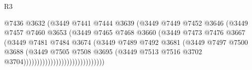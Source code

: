\begin{lexlean}{R3}
\begin{coremodule}
                                            @7436
                                            @3632
                                            (@3449
                                              @7441
                                              @7444
                                              @3639
                                              (@3449
                                                @7449
                                                @7452
                                                @3646
                                                (@3449
                                                  @7457
                                                  @7460
                                                  @3653
                                                  (@3449
                                                    @7465
                                                    @7468
                                                    @3660
                                                    (@3449
                                                      @7473
                                                      @7476
                                                      @3667
                                                      (@3449
                                                        @7481
                                                        @7484
                                                        @3674
                                                        (@3449
                                                          @7489
                                                          @7492
                                                          @3681
                                                          (@3449
                                                            @7497
                                                            @7500
                                                            @3688
                                                            (@3449
                                                              @7505
                                                              @7508
                                                              @3695
                                                              (@3449
                                                                @7513
                                                                @7516
                                                                @3702
                                                                @3704))))))))))))))))))))))))))))))

\end{coremodule}
\end{lexlean}
